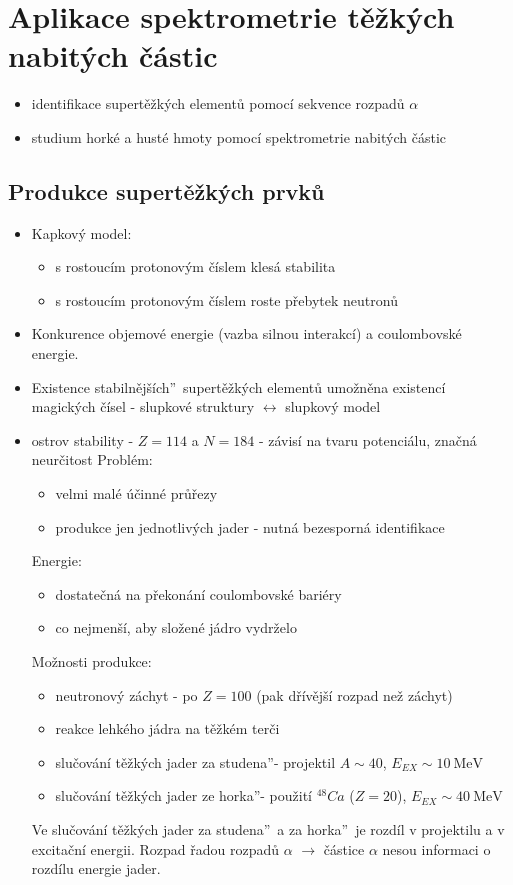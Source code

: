\documentclass[../../main.tex]{subfiles}
\begin{document}
\section{Aplikace spektrometrie těžkých nabitých částic}

\begin{itemize}
	\item identifikace supertěžkých elementů pomocí sekvence rozpadů $\alpha$
	\item studium horké a husté hmoty pomocí spektrometrie nabitých částic
\end{itemize}

\subsection{Produkce supertěžkých prvků}
\begin{itemize}
\item Kapkový model:
\begin{itemize}
	\item s rostoucím protonovým číslem klesá stabilita
	\item s rostoucím protonovým číslem roste přebytek neutronů
\end{itemize}
\item Konkurence objemové energie (vazba silnou interakcí) a coulombovské energie. 
\item Existence \quotedblbase stabilnějších\textquotedblright ~supertěžkých elementů umožněna existencí magických čísel - slupkové struktury $\leftrightarrow$ slupkový model
\item ostrov stability - $Z = 114$ a $N = 184$ - závisí na tvaru potenciálu, značná neurčitost 
Problém:
\begin{itemize}
	\item velmi malé účinné průřezy
	\item produkce jen jednotlivých jader - nutná bezesporná identifikace
\end{itemize}
Energie:
\begin{itemize}
	\item dostatečná na překonání coulombovské bariéry
	\item co nejmenší, aby složené jádro vydrželo
\end{itemize}
Možnosti produkce:
\begin{itemize}
	\item neutronový záchyt - po $Z=100$ (pak dřívější rozpad než záchyt)
	\item reakce lehkého jádra na těžkém terči
	\item slučování těžkých jader \quotedblbase za studena\textquotedblright - projektil $A \sim 40$, $E_{EX} \sim 10 ~\mathrm{MeV}$
	\item slučování těžkých jader \quotedblbase ze horka\textquotedblright - použití $^{48}Ca$ ($Z = 20$), $E_{EX} \sim 40 ~\mathrm{MeV}$
\end{itemize}
Ve slučování těžkých jader \quotedblbase za studena\textquotedblright ~a \quotedblbase za horka\textquotedblright ~je rozdíl v projektilu a v excitační energii. Rozpad řadou rozpadů $\alpha$  $\rightarrow$ částice $\alpha$ nesou informaci o rozdílu energie jader.
\end{itemize}
\end{document}

